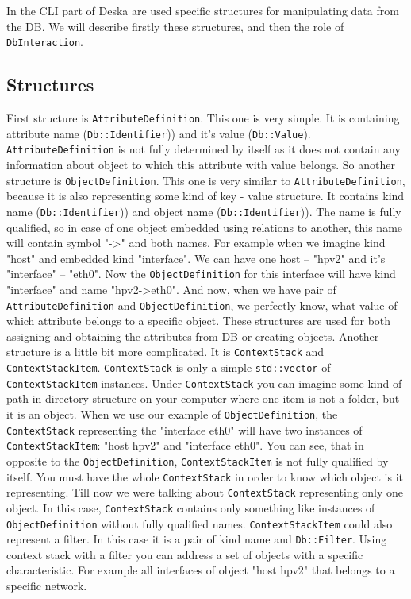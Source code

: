 \documentclass[deska]{subfiles}
\begin{document}
In the CLI part of Deska are used specific structures for manipulating data from the DB. We will describe firstly 
these structures, and then the role of {\tt DbInteraction}.

\subsection{Structures}

First structure is {\tt AttributeDefinition}. This one is very simple. It is containing attribute name ({\tt Db::Identifier}))
and it's value ({\tt Db::Value}). {\tt AttributeDefinition} is not fully determined by itself as it 
does not contain any information about object to which this attribute with value belongs. So another structure is {\tt ObjectDefinition}.
This one is very similar to {\tt AttributeDefinition}, because it is also representing some kind of 
key - value structure. It contains kind name ({\tt Db::Identifier})) and object name ({\tt Db::Identifier})). The name 
is fully qualified, so in case of one object embedded using relations to another, this name will contain symbol "->" 
and both names. For example when we imagine kind "host" and embedded kind "interface". We can have one host -- "hpv2" 
and it's "interface" -- "eth0". Now the {\tt ObjectDefinition} for this interface will have kind "interface" and name 
"hpv2->eth0". And now, when we have pair of {\tt AttributeDefinition} and {\tt ObjectDefinition}, we perfectly know, 
what value of which attribute belongs to a specific object. These structures are used for both assigning and obtaining 
the attributes from DB or creating objects. Another structure is a little bit more complicated. It is {\tt ContextStack}
and {\tt ContextStackItem}. {\tt ContextStack} is only a simple {\tt std::vector} of {\tt ContextStackItem} instances.
Under {\tt ContextStack} you can imagine some kind of path in directory structure on your computer where one item is not
a folder, but it is an object. When we use our example of {\tt ObjectDefinition}, the {\tt ContextStack} representing
the "interface eth0" will have two instances of {\tt ContextStackItem}: "host hpv2" and "interface eth0". You can see,
that in opposite to the {\tt ObjectDefinition}, {\tt ContextStackItem} is not fully qualified by itself. You must have
the whole {\tt ContextStack} in order to know which object is it representing. Till now we were talking about
{\tt ContextStack} representing only one object. In this case, {\tt ContextStack} contains only something like
instances of {\tt ObjectDefinition} without fully qualified names. {\tt ContextStackItem} could also represent a filter.
In this case it is a pair of kind name and {\tt Db::Filter}. Using context stack with a filter you can address a set of
objects with a specific characteristic. For example all interfaces of object "host hpv2" that belongs to a specific
network.
\end{document}
